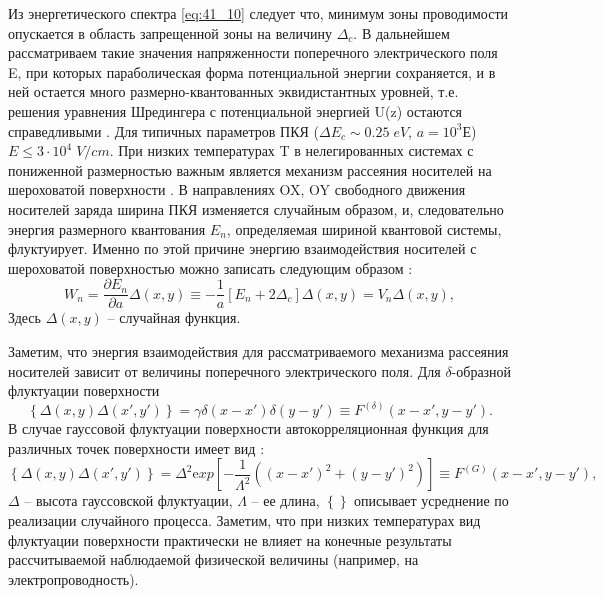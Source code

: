 Из энергетического спектра \eqref{eq:41_10} следует что, минимум зоны проводимости опускается в область запрещенной зоны на величину $\Delta _{c} $. В дальнейшем рассматриваем такие значения напряженности поперечного электрического поля E, при которых параболическая форма потенциальной энергии сохраняется, и в ней остается много размерно-квантованных эквидистантных уровней, т.е. решения уравнения Шредингера с потенциальной энергией U(z) остаются справедливыми \cite{Kanarovskii1995}. Для типичных параметров ПКЯ ($\Delta E_{c} \sim 0.25{\mathrm \; eV}$, $a=10^{3} $Е) $E\le 3\cdot 10^{4} {\mathrm \; V/cm}$. При низких температурах T в нелегированных системах с пониженной размерностью важным является механизм рассеяния носителей на шероховатой поверхности \cite{Sakaki1987,Vurgaftman1999}. В направлениях OX, OY свободного движения носителей заряда ширина ПКЯ изменяется случайным образом, и, следовательно энергия размерного квантования $E_{n} $, определяемая шириной квантовой системы, флуктуирует. Именно по этой причине энергию взаимодействия носителей с шероховатой поверхностью можно записать следующим образом \cite{Sakaki1987}:
\begin{equation} \label{eq:41_20}
W_{n} =\frac{\partial E_{n} }{\partial a} \Delta (x,y)\equiv -\frac{1}{a} \left[E_{n} +2\Delta _{c} \right]\Delta (x,y)=V_{n} \Delta (x,y),
\end{equation}
Здесь $\Delta (x,y)$ -- случайная функция.

Заметим, что энергия взаимодействия для рассматриваемого механизма рассеяния носителей зависит от величины поперечного электрического поля. Для $\delta $-образной флуктуации поверхности
\begin{equation} \label{eq:41_30}
\left\{\Delta (x,y)\Delta (x',y')\right\}=\gamma \delta (x-x')\delta (y-y')\equiv F^{(\delta )} \left(x-x',y-y'\right).
\end{equation} 
В случае гауссовой флуктуации поверхности автокорреляционная функция для различных точек поверхности имеет вид \cite{Sakaki1987}:
\begin{equation} \label{eq:41_40}
\left\{\Delta (x,y)\Delta (x',y')\right\}=\Delta ^{2} {\mathrm exp}\left[-\frac{1}{\Lambda ^{2} } \left((x-x')^{2} +(y-y')^{2} \right)\right]\equiv F^{(G)} \left(x-x',y-y'\right),
\end{equation} 
$\Delta $ -- высота гауссовской флуктуации, $\Lambda $ -- ее длина, $\left\{\right\}$ описывает усреднение по реализации случайного процесса. Заметим, что при низких температурах вид флуктуации поверхности практически не влияет на конечные результаты рассчитываемой наблюдаемой физической величины (например, на электропроводность).

